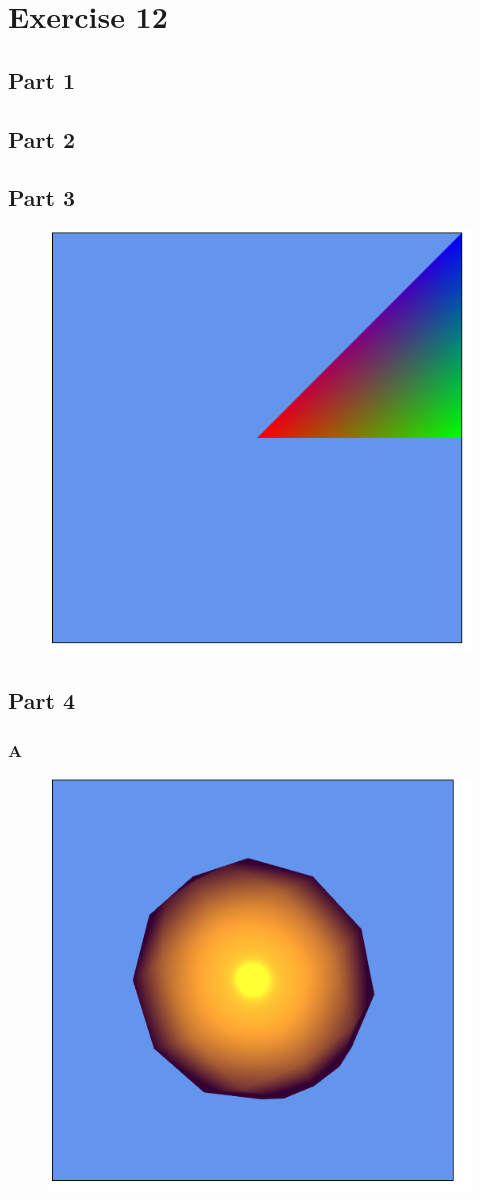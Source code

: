 \documentclass[11pt]{article}
\begin{document}
\section{Exercise 12}
\subsection{Part 1}
\subsection{Part 2}
\subsection{Part 3}
\begin{figure}[H]
	\centering
	\includegraphics[width=0.5\linewidth]{images/e12p3}
	\label{fig:e12p3}
\end{figure}

\subsection{Part 4}
\subsubsection{A}
\begin{figure}[H]
	\centering
	\includegraphics[width=0.5\linewidth]{images/e12p4a}
	\label{fig:e12p4a}
\end{figure}
\end{document}
